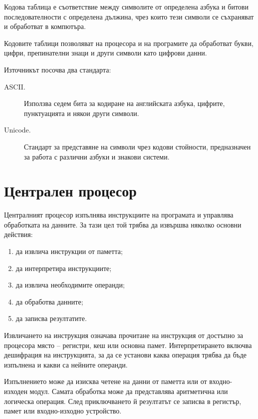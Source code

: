 \begin{defn}
Кодова таблица е съответствие между символите от определена азбука и битови последователности с определена дължина, чрез които тези символи се съхраняват и обработват в компютъра.
\end{defn}

Кодовите таблици позволяват на процесора и на програмите да обработват букви, цифри, препинателни знаци и други символи като цифрови данни.

Източникът посочва два стандарта:

\begin{description}
    \item[ASCII.] Използва седем бита за кодиране на английската азбука, цифрите, пунктуацията и някои други символи.
    \item[Unicode.] Стандарт за представяне на символи чрез кодови стойности, предназначен за работа с различни азбуки и знакови системи.
\end{description}

\section{Централен процесор}\label{s:9.3}

Централният процесор изпълнява инструкциите на програмата и управлява обработката на данните. За тази цел той трябва да извършва няколко основни действия:

\begin{enumerate}
    \item да извлича инструкции от паметта;
    \item да интерпретира инструкциите;
    \item да извлича необходимите операнди;
    \item да обработва данните;
    \item да записва резултатите.
\end{enumerate}

Извличането на инструкция означава прочитане на инструкция от достъпно за процесора място -- регистри, кеш или основна памет. Интерпретирането включва дешифрация на инструкцията, за да се установи каква операция трябва да бъде изпълнена и какви са нейните операнди.

Изпълнението може да изисква четене на данни от паметта или от входно-изходен модул. Самата обработка може да представлява аритметична или логическа операция. След приключването й резултатът се записва в регистър, памет или входно-изходно устройство.

